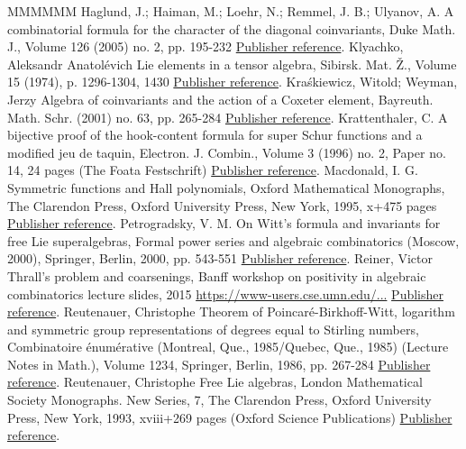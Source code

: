 \documentclass[11pt]{article}
\theoremstyle{definition}
\numberwithin{equation}{section}
\begin{document}
\begin{thebibliography}{MMMMMM}
 Haglund, J.; Haiman, M.; Loehr, N.; Remmel, J. B.; Ulyanov, A. A combinatorial formula for the character of the diagonal coinvariants, Duke Math. J., Volume 126 (2005) no. 2, pp. 195-232 \href{https://alco.centre-mersenne.org/articles/10.5802/alco.421/#HHLRU}{Publisher reference}.
 Klyachko, Aleksandr Anatolévich Lie elements in a tensor algebra, Sibirsk. Mat. Ž., Volume 15 (1974), p. 1296-1304, 1430 \href{https://alco.centre-mersenne.org/articles/10.5802/alco.421/#Kly}{Publisher reference}.
 Kraśkiewicz, Witold; Weyman, Jerzy Algebra of coinvariants and the action of a Coxeter element, Bayreuth. Math. Schr. (2001) no. 63, pp. 265-284 \href{https://alco.centre-mersenne.org/articles/10.5802/alco.421/#KW}{Publisher reference}.
 Krattenthaler, C. A bijective proof of the hook-content formula for super Schur functions and a modified jeu de taquin, Electron. J. Combin., Volume 3 (1996) no. 2, Paper no. 14, 24 pages (The Foata Festschrift) \href{https://alco.centre-mersenne.org/articles/10.5802/alco.421/#Kratt}{Publisher reference}.
 Macdonald, I. G. Symmetric functions and Hall polynomials, Oxford Mathematical Monographs, The Clarendon Press, Oxford University Press, New York, 1995, x+475 pages \href{https://alco.centre-mersenne.org/articles/10.5802/alco.421/#Mac}{Publisher reference}.
 Petrogradsky, V. M. On Witt’s formula and invariants for free Lie superalgebras, Formal power series and algebraic combinatorics (Moscow, 2000), Springer, Berlin, 2000, pp. 543-551 \href{https://alco.centre-mersenne.org/articles/10.5802/alco.421/#Pet}{Publisher reference}.
 Reiner, Victor Thrall’s problem and coarsenings, Banff workshop on positivity in algebraic combinatorics lecture slides, 2015 \url{https://www-users.cse.umn.edu/...} \href{https://alco.centre-mersenne.org/articles/10.5802/alco.421/#Rei}{Publisher reference}.
 Reutenauer, Christophe Theorem of Poincaré-Birkhoff-Witt, logarithm and symmetric group representations of degrees equal to Stirling numbers, Combinatoire énumérative (Montreal, Que., 1985/Quebec, Que., 1985) (Lecture Notes in Math.), Volume 1234, Springer, Berlin, 1986, pp. 267-284 \href{https://alco.centre-mersenne.org/articles/10.5802/alco.421/#Reu-idemp}{Publisher reference}.
 Reutenauer, Christophe Free Lie algebras, London Mathematical Society Monographs. New Series, 7, The Clarendon Press, Oxford University Press, New York, 1993, xviii+269 pages (Oxford Science Publications) \href{https://alco.centre-mersenne.org/articles/10.5802/alco.421/#Reu}{Publisher reference}.

\end{thebibliography}
\end{document}
